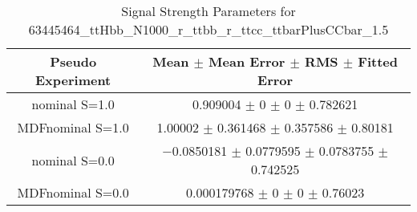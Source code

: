 \begin{table}
\centering
\caption{Signal Strength Parameters for 63445464\_ttHbb\_N1000\_r\_ttbb\_r\_ttcc\_ttbarPlusCCbar\_1.5}
\begin{tabular}{cc}
\toprule
Pseudo Experiment & Mean $\pm$ Mean Error $\pm$ RMS $\pm$ Fitted Error\\
\midrule
nominal S=1.0 & \num{0.909004} $\pm$ \num{0} $\pm$ \num{0} $\pm$ \num{0.782621}\\
MDFnominal S=1.0 & \num{1.00002} $\pm$ \num{0.361468} $\pm$ \num{0.357586} $\pm$ \num{0.80181}\\
nominal S=0.0 & \num{-0.0850181} $\pm$ \num{0.0779595} $\pm$ \num{0.0783755} $\pm$ \num{0.742525}\\
MDFnominal S=0.0 & \num{0.000179768} $\pm$ \num{0} $\pm$ \num{0} $\pm$ \num{0.76023}\\
\bottomrule
\end{tabular}
\end{table}